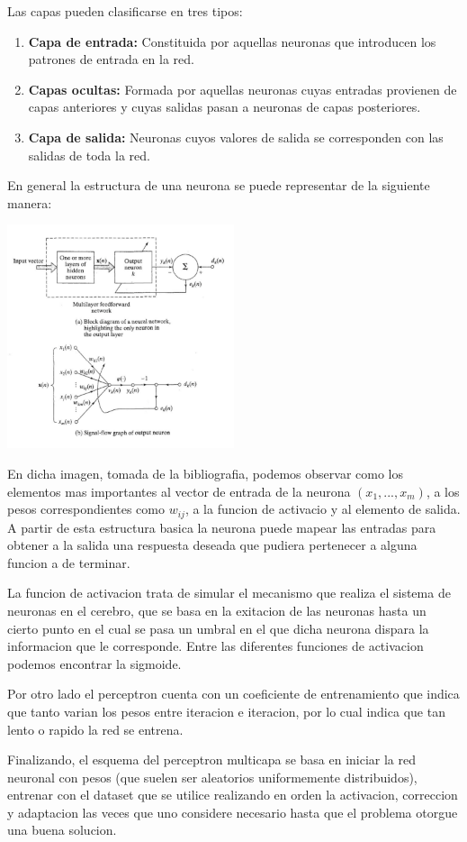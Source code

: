 Las capas pueden clasificarse en tres tipos:

\begin{enumerate}
\item \textbf{Capa de entrada:} Constituida por aquellas neuronas que introducen los patrones de entrada en la red. 
\item \textbf{Capas ocultas:} Formada por aquellas neuronas cuyas entradas provienen de capas anteriores y cuyas salidas pasan a neuronas de capas posteriores.
\item \textbf{Capa de salida:} Neuronas cuyos valores de salida se corresponden con las salidas de toda la red.
\end{enumerate}


En general la estructura de una neurona se puede representar de la siguiente manera:

\begin{center}
\includegraphics[width=0.5\textwidth]{img/neurona}
\end{center}

En dicha imagen, tomada de la bibliografia, podemos observar como los elementos mas importantes al vector de entrada de la neurona $(x_1,...,x_m)$, a los pesos correspondientes como $w_{ij}$, a la funcion de activacio y al elemento de salida. A partir de esta estructura basica la neurona puede mapear las entradas para obtener a la salida una respuesta deseada que pudiera pertenecer a alguna funcion a de terminar.



La funcion de activacion trata de simular el mecanismo que realiza el sistema de neuronas en el cerebro, que se basa en la exitacion de las neuronas hasta un cierto punto en el cual se pasa un umbral en el que dicha neurona dispara la informacion que le corresponde. Entre las diferentes funciones de activacion podemos encontrar la sigmoide.


Por otro lado el perceptron cuenta con un coeficiente de entrenamiento que indica que tanto varian los pesos entre iteracion e iteracion, por lo cual indica que tan lento o rapido la red se entrena.

Finalizando, el esquema del perceptron multicapa se basa en iniciar la red neuronal con pesos (que suelen ser aleatorios uniformemente distribuidos), entrenar con el dataset que se utilice realizando en orden la activacion, correccion y adaptacion las veces que uno considere necesario hasta que el problema otorgue una buena solucion.